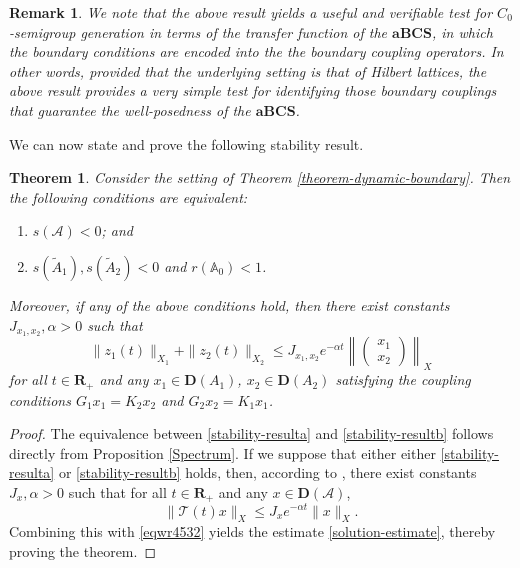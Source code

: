 \documentclass[a4paper,11pt,reqno]{amsart}
\def\A{{\mathbb{A}}}
\def\calT{{\mathcal{T}}}
\def\calA{{\mathcal{A}}}
\def\R{\mathbf{R}}
\newtheorem{theorem}{Theorem}[section]
\theoremstyle{plain}
\newtheorem{remark}{Remark}[section]
\numberwithin{equation}{section}
\begin{document}
\begin{remark}\label{test-remark1}
We note that the above result yields a useful and verifiable test for $C_0$-semigroup generation in terms of the transfer function of the $\mathbf{aBCS}$, in which the boundary conditions are encoded into the the boundary coupling operators. In other words, provided that the underlying setting is that of Hilbert lattices, the above result provides a very simple test for identifying those boundary couplings that guarantee the well-posedness of the $\mathbf{aBCS}$.
\end{remark}

We can now state and prove the following stability result.
\begin{theorem}\label{stability-result}
Consider the setting of Theorem \ref{theorem-dynamic-boundary}. Then the following conditions are equivalent:
\begin{enumerate}[\normalfont(i)]
\item\label{stability-resulta} $s(\calA)<0 $; and
\item\label{stability-resultb} $s(\tilde{A}_1),s(\tilde{A}_2)<0$ and $r(\A_0)<1$.
\end{enumerate}
Moreover, if any of the above conditions hold, then there exist constants $J_{x_1,x_2},\alpha>0$ such that
\begin{equation}\label{solution-estimate}
\| z_1(t)\|_{X_1}+\| z_2(t)\|_{X_2}\le J_{x_1,x_2} e^{-\alpha t}\left\| \left(\begin{matrix}
x_1\\
x_2
\end{matrix}\right)\right\|_{X}
\end{equation}
for all $t\in\R_+$ and any $x_1\in {\bm D}(A_1)$, $x_2\in {\bm D}(A_2)$ satisfying the coupling conditions $G_1 x_1=K_2 x_2$ and $ G_2 x_2=K_1 x_1$.
\end{theorem}
\begin{proof}
The equivalence between \ref{stability-resulta} and \ref{stability-resultb} follows directly from Proposition \ref{Spectrum}. If we suppose that either either \ref{stability-resulta} or \ref{stability-resultb} holds, then, according to \cite[Corollary C-IV.1.4]{MR839450}, there exist constants $J_x,\alpha>0$ such that for all $t\in\R_+$ and any $x\in {\bm D}(\calA)$,
\begin{equation*}
\| \calT(t)x\|_{X}\le J_x e^{-\alpha t}\| x\|_{ X}.
\end{equation*}
Combining this with \eqref{eqwr4532} yields the estimate \eqref{solution-estimate}, thereby proving the theorem.
\end{proof}
\end{document}
